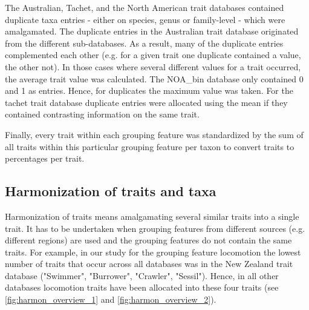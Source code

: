 \documentclass{article}
\begin{document}

The Australian, Tachet, and the North American trait databases contained duplicate taxa entries
- either on species, genus or family-level - which were amalgamated. 
The duplicate entries in the Australian trait database originated from the different sub-databases. 
As a result, many of the duplicate entries complemented each other (e.g. for a given trait one duplicate contained a value, 
the other not). In those cases where several different values for a trait occurred, the average trait value was calculated. 
The NOA\_bin database only contained 0 and 1 as entries. Hence, for duplicates the maximum value was taken.
For the tachet trait database duplicate entries were allocated using the mean if they contained contrasting
information on the same trait. 

Finally, every trait within each grouping feature was standardized by the sum of all traits 
within this particular grouping feature per taxon to convert traits to percentages per trait. 

\subsection{Harmonization of traits and taxa}

Harmonization of traits means amalgamating several similar traits into a single trait. 
It has to be undertaken when grouping features from different sources (e.g. different regions) are
used and the grouping features do not contain the same traits. 
For example, in our study for the grouping feature locomotion the lowest number of traits that occur
across all databases was in the New Zealand trait database ("Swimmer", "Burrower", "Crawler", "Sessil"). 
Hence, in all other databases locomotion traits have been allocated into these four traits (see \ref{fig:harmon_overview_1}
and \ref{fig:harmon_overview_2}).
\end{document}

